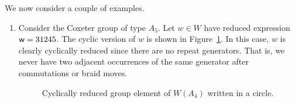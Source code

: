 \begin{example}\label{ex:kappa} We now consider a couple of examples.
\begin{enumerate}[label=(\alph*), leftmargin=0.75in]
\item Consider the Coxeter group of type $A_5$. Let $w \in W$ have reduced expression $\mathsf{w} = 31245$.
    The cyclic version of $w$ is shown in Figure~\ref{fig:circles}. In this case, $w$ is clearly cyclically reduced since there are no repeat generators. That is, we never have two adjacent occurrences of the same generator after commutations or braid moves.

\begin{center} \begin{figure}[H] \centering
{}
\caption{Cyclically reduced group element of $W(A_4)$ written in a circle.} \label{fig:circles}
\end{figure} \end{center}


\end{enumerate}
\end{example}
